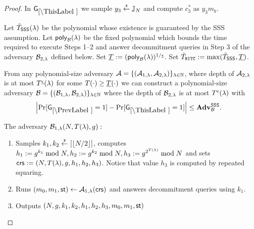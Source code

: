\begin{proof}
%


In $\games_\thisgame$ we sample $y_3 \stackrel{{\scriptscriptstyle\$}}{\leftarrow} \mathbb{J}_N$ and compute $c_3^*$ as $y_3 m_b$.

Let $\tilde{T}_\mathsf{SSS}(\lambda)$ be the polynomial whose existence is guaranteed by the SSS assumption.
Let $\mathsf{poly}_{\mathcal{B}}(\lambda)$ be the fixed polynomial which bounds the time required to execute Steps 1--2 and answer decommitment queries in Step 3 of the adversary $\mathcal{B}_{2, \lambda}$ defined below. Set $\underline{T} := (\mathsf{poly}_{\mathcal{B}}(\lambda))^{1 / \underline{\epsilon}}$.  Set $\tilde{T}_{\mathtt{NITC}} := \max(\tilde{T}_\mathsf{SSS}, \underline{T})$.
\begin{lemma}
From any polynomial-size adversary $\mathcal{A} = \{(\mathcal{A}_{1,\lambda}, \mathcal{A}_{2, \lambda})\}_{\lambda \in \mathbb{N}}$, where depth of $\mathcal{A}_{2, \lambda}$ is at most $T^{\underline{\epsilon}}(\lambda)$ for some $T(\cdot) \geq \underline{T}(\cdot)$ we can construct a polynomial-size adversary $\mathcal{B} = \{(\mathcal{B}_{1,\lambda}, \mathcal{B}_{2, \lambda})\}_{\lambda \in \mathbb{N}}$ where the depth of $\mathcal{B}_{2, \lambda}$ is at most $T^{\epsilon}(\lambda)$ with
\[
\left|\Pr[\games_\prevgame = 1] - \Pr[\games_\thisgame = 1]\right| \leq \advtg_\advB^\sss.
\]
\end{lemma}

The adversary $\mathcal{B}_{1,\lambda}(N, T(\lambda), g):$
\vspace{-2mm}
\begin{enumerate}
\item Samples $k_1, k_2 \stackrel{{\scriptscriptstyle\$}}{\leftarrow} [\left\lfloor N/2 \right\rfloor]$, computes $h_1 := g^{k_1} \bmod N, h_2 := g^{k_2} \bmod N,  h_3 := g^{2^{T(\lambda)}} \bmod N$ and sets $\mathsf{crs}:=(N, T(\lambda), g, h_1, h_2, h_3)$. Notice that value $h_3$ is computed by repeated squaring.
\item Runs $(m_0, m_1, \mathsf{st}) \leftarrow \mathcal{A}_{1, \lambda}(\mathsf{crs})$ and answers decommitment queries using $k_1$.
\item Outputs $(N,g,k_1, k_2, h_1,h_2,h_3, m_0, m_1, \mathsf{st})$
\end{enumerate}


\end{proof}
